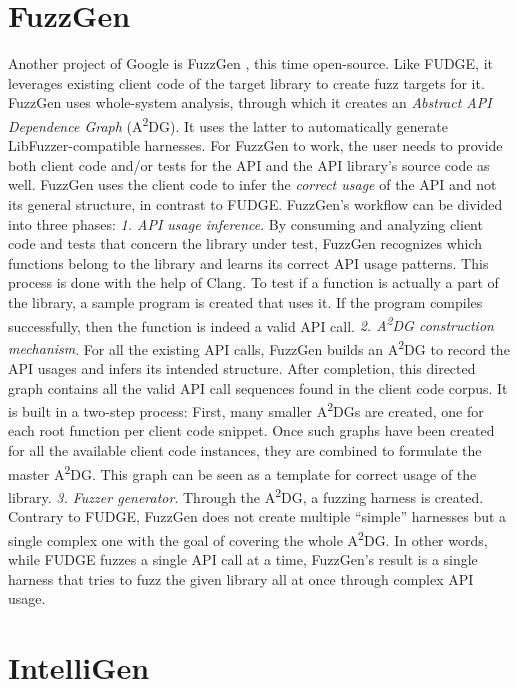\documentclass[
  a4paper,
]{scrreprt}
\theoremstyle{definition}
\theoremstyle{remark}
\begin{document}
\section{FuzzGen}\label{fuzzgen}

Another project of Google is FuzzGen \autocite{fuzzgen}, this time
open-source. Like FUDGE, it leverages existing client code of the target
library to create fuzz targets for it. FuzzGen uses whole-system
analysis, through which it creates an \emph{Abstract API Dependence
Graph} (A\textsuperscript{2}DG). It uses the latter to automatically
generate LibFuzzer-compatible harnesses. For FuzzGen to work, the user
needs to provide both client code and/or tests for the API and the API
library's source code as well. FuzzGen uses the client code to infer the
\emph{correct usage} of the API and not its general structure, in
contrast to FUDGE. FuzzGen's workflow can be divided into three phases:
\emph{1. API usage inference}. By consuming and analyzing client code
and tests that concern the library under test, FuzzGen recognizes which
functions belong to the library and learns its correct API usage
patterns. This process is done with the help of Clang. To test if a
function is actually a part of the library, a sample program is created
that uses it. If the program compiles successfully, then the function is
indeed a valid API call. \emph{2. A\textsuperscript{2}DG construction
mechanism}. For all the existing API calls, FuzzGen builds an
A\textsuperscript{2}DG to record the API usages and infers its intended
structure. After completion, this directed graph contains all the valid
API call sequences found in the client code corpus. It is built in a
two-step process: First, many smaller A\textsuperscript{2}DGs are
created, one for each root function per client code snippet. Once such
graphs have been created for all the available client code instances,
they are combined to formulate the master A\textsuperscript{2}DG. This
graph can be seen as a template for correct usage of the library.
\emph{3. Fuzzer generator}. Through the A\textsuperscript{2}DG, a
fuzzing harness is created. Contrary to FUDGE, FuzzGen does not create
multiple ``simple'' harnesses but a single complex one with the goal of
covering the whole A\textsuperscript{2}DG. In other words, while FUDGE
fuzzes a single API call at a time, FuzzGen's result is a single harness
that tries to fuzz the given library all at once through complex API
usage.

\section{IntelliGen}\label{intelligen}
\end{document}
